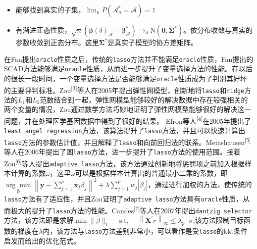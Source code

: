 \documentclass[
]{ctexart}
\newcommand{\passthrough}[1]{#1}
\providecommand{\tightlist}{%
  \setlength{\itemsep}{0pt}\setlength{\parskip}{0pt}}
\begin{document}
\begin{itemize}
\tightlist
\item
  能够找到真实的子集，\(\lim _{n} P\left(\mathcal{A}_{n}^{*}=\mathcal{A}\right)=1\)
\item
  有渐进正态性质，\(\sqrt{n}\left(\boldsymbol{\beta}(\delta)_{\mathcal{A}}-\boldsymbol{\beta}_{\mathcal{A}}^{*}\right) \rightarrow_{d}\mathrm{N}\left(\mathbf{0}, \boldsymbol{\Sigma}^{*}\right)\)。依分布收敛与真实的参数收敛到正态分布。这里\(\boldsymbol{\Sigma}^{*}\)是真实子模型的协方差矩阵。
\end{itemize}

在Fan提出\passthrough{\lstinline!oracle!}性质之后，传统的\passthrough{\lstinline!lasso!}方法并不能满足\passthrough{\lstinline!oracle!}性质，Fan提出的SCAD方法能够满足\passthrough{\lstinline!oracle!}性质，从而进一步提升了变量选择方法的性能。在以后的很长一段时间，一个变量选择方法是否能够满足\passthrough{\lstinline!oracle!}性质成为了判别其好坏的主要评判标准。Zou\textsuperscript{{[}3{]}}等人在2005年提出弹性网模型，创新地将\passthrough{\lstinline!lasso!}和\passthrough{\lstinline!ridge!}方法的\(L_1\)和\(L_2\)范数结合到一起，弹性网模型能够较好的解决数据中存在较强相关的两个变量的情况，Zou通过数学方法巧妙地证明了弹性网模型能够很好的解决这一问题，并在处理医学基因数据中得到了很好的结果。
Efron等人\textsuperscript{{[}4{]}}在2005年提出了\passthrough{\lstinline!least angel regression!}方法，该算法提升了\passthrough{\lstinline!lasso!}方法，并且可以快速计算出\passthrough{\lstinline!lasso!}方法的参数估计值，并且解释了\passthrough{\lstinline!lasso!}和向前回归法的联系。Meinshausen\textsuperscript{{[}5{]}}等人在2006年提出了图\passthrough{\lstinline!lasso!}方法，进一步提升了\passthrough{\lstinline!lasso!}方法的使用范围。接着Zou\textsuperscript{{[}6{]}}等人提出\passthrough{\lstinline!adaptive lasso!}方法，该方法通过创新地将惩罚项之前加入根据样本计算的系数\(\omega\)，这里\(\omega\)可以是根据样本计算出的普通最小二乘的系数，即\(\underset{\boldsymbol{\beta}}{\arg \min }\left\|\mathbf{y}-\sum_{j=1}^{p} \mathbf{x}_{j} \beta_{j}\right\|^{2}+\lambda \sum_{j=1}^{p} w_{j}\left|\beta_{j}\right|\)，通过进行加权的方法，使传统的\passthrough{\lstinline!lasso!}方法有了适应性，并且Zou证明了\passthrough{\lstinline!adaptive lasso!}方法具有\passthrough{\lstinline!oracle!}性质，从而极大的提升了\passthrough{\lstinline!lasso!}方法的性能。Candes\textsuperscript{{[}7{]}}等人在2007年提出\passthrough{\lstinline!dantzig selector!}方法，该方法即是求解\(\min \|\hat{\beta}\|_{1} \quad\)
s.t.
\(\quad\left\|\boldsymbol{X}^{\prime} r\right\|_{\infty} \leq \lambda_{p} \cdot \sigma\),该方法限制目标函数的梯度在\(\lambda\)内，该方法与\passthrough{\lstinline!lasso!}方法差别非常小，可以看作是受\passthrough{\lstinline!lasso!}的kkt条件启发而给出的优化范式。
\end{document}
